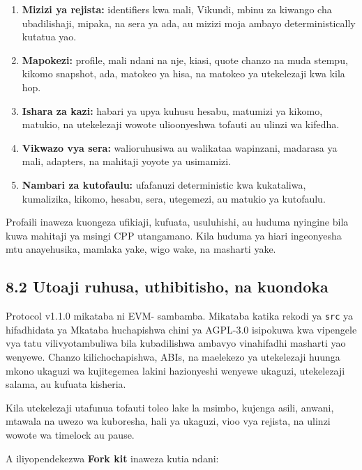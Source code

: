 \documentclass[11pt]{article}
\begin{document}
\begin{enumerate}[leftmargin=*]
\item \textbf{Mizizi ya rejista:} identifiers kwa mali, Vikundi, mbinu za kiwango cha ubadilishaji, mipaka, na sera ya ada, au mizizi moja ambayo deterministically kutatua yao.
\item \textbf{Mapokezi:} profile, mali ndani na nje, kiasi, quote chanzo na muda stempu, kikomo snapshot, ada, matokeo ya hisa, na matokeo ya utekelezaji kwa kila hop.
\item \textbf{Ishara za kazi:} habari ya upya kuhusu hesabu, matumizi ya kikomo, matukio, na utekelezaji wowote ulioonyeshwa tofauti au ulinzi wa kifedha.
\item \textbf{Vikwazo vya sera:} walioruhusiwa au walikataa wapinzani, madarasa ya mali, adapters, na mahitaji yoyote ya usimamizi.
\item \textbf{Nambari za kutofaulu:} ufafanuzi deterministic kwa kukataliwa, kumalizika, kikomo, hesabu, sera, utegemezi, au matukio ya kutofaulu.
\end{enumerate}
Profaili inaweza kuongeza ufikiaji, kufuata, usuluhishi, au huduma nyingine bila kuwa mahitaji ya msingi CPP utangamano. Kila huduma ya hiari ingeonyesha mtu anayehusika, mamlaka yake, wigo wake, na masharti yake.

\subsection*{8.2 Utoaji ruhusa, uthibitisho, na kuondoka}

Protocol v1.1.0 mikataba ni EVM- sambamba. Mikataba katika rekodi ya \texttt{src} ya hifadhidata ya Mkataba huchapishwa chini ya AGPL-3.0 isipokuwa kwa vipengele vya tatu vilivyotambuliwa bila kubadilishwa ambavyo vinahifadhi masharti yao wenyewe. Chanzo kilichochapishwa, ABIs, na maelekezo ya utekelezaji huunga mkono ukaguzi wa kujitegemea lakini hazionyeshi wenyewe ukaguzi, utekelezaji salama, au kufuata kisheria.

Kila utekelezaji utafunua tofauti toleo lake la msimbo, kujenga asili, anwani, mtawala na uwezo wa kuboresha, hali ya ukaguzi, vioo vya rejista, na ulinzi wowote wa timelock au pause.

A iliyopendekezwa \textbf{Fork kit} inaweza kutia ndani:
\end{document}
